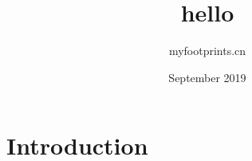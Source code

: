 \documentclass{article}
\title{hello}
\author{myfootprints.cn }
\date{September 2019}
\begin{document}
\maketitle

\section{Introduction}
\end{document}
